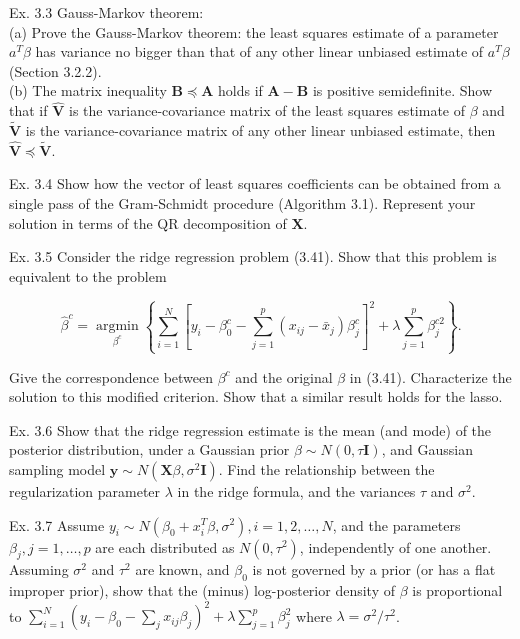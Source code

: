 \documentclass[10pt]{article}
\begin{document}
Ex. 3.3 Gauss-Markov theorem:\\
(a) Prove the Gauss-Markov theorem: the least squares estimate of a parameter $a^{T} \beta$ has variance no bigger than that of any other linear unbiased estimate of $a^{T} \beta$ (Section 3.2.2).\\
(b) The matrix inequality $\mathbf{B} \preceq \mathbf{A}$ holds if $\mathbf{A}-\mathbf{B}$ is positive semidefinite. Show that if $\hat{\mathbf{V}}$ is the variance-covariance matrix of the least squares estimate of $\beta$ and $\tilde{\mathbf{V}}$ is the variance-covariance matrix of any other linear unbiased estimate, then $\hat{\mathbf{V}} \preceq \tilde{\mathbf{V}}$.

Ex. 3.4 Show how the vector of least squares coefficients can be obtained from a single pass of the Gram-Schmidt procedure (Algorithm 3.1). Represent your solution in terms of the QR decomposition of $\mathbf{X}$.

Ex. 3.5 Consider the ridge regression problem (3.41). Show that this problem is equivalent to the problem


\begin{equation*}
\hat{\beta}^{c}=\underset{\beta^{c}}{\operatorname{argmin}}\left\{\sum_{i=1}^{N}\left[y_{i}-\beta_{0}^{c}-\sum_{j=1}^{p}\left(x_{i j}-\bar{x}_{j}\right) \beta_{j}^{c}\right]^{2}+\lambda \sum_{j=1}^{p} \beta_{j}^{c 2}\right\} . \tag{3.85}
\end{equation*}


Give the correspondence between $\beta^{c}$ and the original $\beta$ in (3.41). Characterize the solution to this modified criterion. Show that a similar result holds for the lasso.

Ex. 3.6 Show that the ridge regression estimate is the mean (and mode) of the posterior distribution, under a Gaussian prior $\beta \sim N(0, \tau \mathbf{I})$, and Gaussian sampling model $\mathbf{y} \sim N\left(\mathbf{X} \beta, \sigma^{2} \mathbf{I}\right)$. Find the relationship between the regularization parameter $\lambda$ in the ridge formula, and the variances $\tau$ and $\sigma^{2}$.

Ex. 3.7 Assume $y_{i} \sim N\left(\beta_{0}+x_{i}^{T} \beta, \sigma^{2}\right), i=1,2, \ldots, N$, and the parameters $\beta_{j}, j=1, \ldots, p$ are each distributed as $N\left(0, \tau^{2}\right)$, independently of one another. Assuming $\sigma^{2}$ and $\tau^{2}$ are known, and $\beta_{0}$ is not governed by a prior (or has a flat improper prior), show that the (minus) log-posterior density of $\beta$ is proportional to $\sum_{i=1}^{N}\left(y_{i}-\beta_{0}-\sum_{j} x_{i j} \beta_{j}\right)^{2}+\lambda \sum_{j=1}^{p} \beta_{j}^{2}$ where $\lambda=\sigma^{2} / \tau^{2}$.
\end{document}
